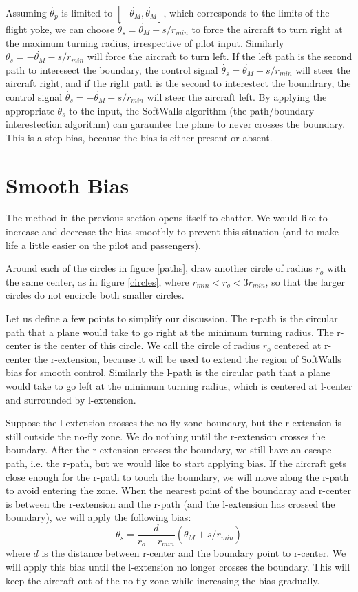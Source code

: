 \documentclass[11pt]{article}
\begin{document}
Assuming $\dot{\theta_{p}}$ is limited to $[-\dot{\theta_{M}},
\dot{\theta_{M}}]$, which corresponds to the limits of the flight
yoke, we can choose $\dot{\theta_{s}} = \dot{\theta_{M}} + s/r_{min}$
to force the aircraft to turn right at the maximum turning radius,
irrespective of pilot input.  Similarly $\dot{\theta_{s}} =
-\dot{\theta_{M}} - s/r_{min}$ will force the aircraft to turn left.
If the left path is the second path to interesect the boundary, the
control signal $\dot{\theta_{s}} = \dot{\theta_{M}} + s/r_{min}$ will
steer the aircraft right, and if the right path is the second to
interestect the boundrary, the control signal $\dot{\theta_{s}} =
-\dot{\theta_{M}} - s/r_{min}$ will steer the aircraft left.  By
applying the appropriate $\theta_{s}$ to the input, the SoftWalls
algorithm (the path/boundary-interestection algorithm) can garauntee
the plane to never crosses the boundary.  This is a step bias, because
the bias is either present or absent.

\section{Smooth Bias}

The method in the previous section opens itself to chatter.  We would
like to increase and decrease the bias smoothly to prevent this
situation (and to make life a little easier on the pilot and passengers).

Around each of the circles in figure \ref{paths}, draw another circle
of radius $r_{o}$ with the same center, as in figure \ref{circles},
where $r_{min} < r_{o} < 3r_{min}$, so that the larger circles do not
encircle both smaller circles.

Let us define a few points to simplify our discussion.  The r-path is
the circular path that a plane would take to go right at the minimum
turning radius.  The r-center is the center of this circle.  We call
the circle of radius $r_{o}$ centered at r-center the r-extension,
because it will be used to extend the region of SoftWalls bias for
smooth control.  Similarly the l-path is the circular path that a
plane would take to go left at the minimum turning radius, which is
centered at l-center and surrounded by l-extension.

Suppose the l-extension crosses the no-fly-zone boundary, but the
r-extension is still outside the no-fly zone.  We do nothing until the
r-extension crosses the boundary.  After the r-extension crosses the
boundary, we still have an escape path, i.e. the r-path, but we would
like to start applying bias.  If the aircraft gets close enough for
the r-path to touch the boundary, we will move along the r-path to
avoid entering the zone.  When the nearest point of the boundaray and
r-center is between the r-extension and the r-path (and the l-extension
has crossed the boundary), we will apply the following bias:
\[
\dot{\theta_{s}} = \frac{d}{r_{o} - r_{min}} (\dot{\theta_{M}} + s/r_{min})
\]
where $d$ is the distance between r-center and the boundary point to
r-center.  We will apply this bias until the l-extension no longer
crosses the boundary.  This will keep the aircraft out of the no-fly
zone while increasing the bias gradually.

\begin{figure}[btp]
\centering
\end{figure}
\end{document}
